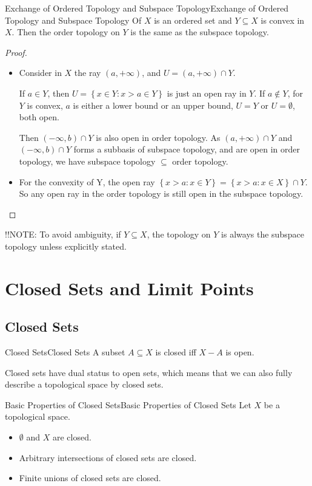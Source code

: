 \documentclass[../main.tex]{subfiles}
\begin{document}
\begin{theorem}{Exchange of Ordered Topology and Subspace Topology}{Exchange of Ordered Topology and Subspace Topology}
Of $X$ is an ordered set and $Y \subseteq X$ is convex in $X$. Then the order topology on $Y$ is the same as the subspace topology.
\end{theorem}
\begin{proof}
	\begin{itemize}
	\item Consider in $X$ the ray $(a,+\infty )$, and $U = (a, +\infty )\cap Y$.

	If $a\in Y$, then $U = \left\{ x\in Y: x>a\in Y \right\}$ is just an open ray in $Y$. If $a\notin Y$, for $Y$ is convex, $a$ is either a lower bound or an upper bound,  $U=Y$ or $U=\emptyset $, both open.

	Then $(-\infty ,b)\cap Y$ is also open in order topology. As $(a,+\infty )\cap Y$ and $(-\infty ,b)\cap Y$ forms a subbasis of subspace topology, and are open in order topology, we have subspace topology $\subseteq $ order topology.
	\item For the convexity of Y, the open ray  $\left\{ x>a: x\in Y \right\} = \left\{ x>a: x\in X \right\}\cap Y$. So any open ray in the order topology is still open in the subspace topology.
	\end{itemize}
\end{proof}

!!NOTE: To avoid ambiguity, if $Y \subseteq X$, the topology on $Y$ is always the subspace topology unless explicitly stated.

\section{Closed Sets and Limit Points}
\subsection{Closed Sets}
\begin{definition}{Closed Sets}{Closed Sets}
A subset $A \subseteq X$ is closed iff $X-A$ is open.
\end{definition}

Closed sets have dual status to open sets, which means that we can also fully describe a topological space by closed sets.

\begin{theorem}{Basic Properties of Closed Sets}{Basic Properties of Closed Sets}
Let $X$ be a topological space.
\begin{itemize}
\item $\emptyset $ and $X$ are closed.
\item Arbitrary intersections of closed sets are closed.
\item Finite unions of closed sets are closed.
\end{itemize}
\end{theorem}
\end{document}
